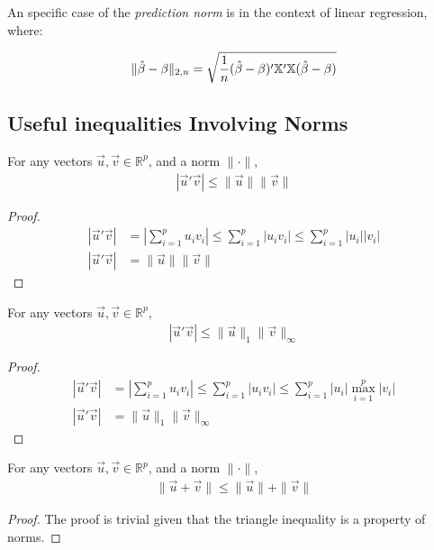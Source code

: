 An specific case of the \emph{prediction norm} is in the context of linear regression, where:

\[
    \|\hat{\beta} - \beta\|_{2, n} 
    = 
    \sqrt{
        \frac{1}{n}
        (\hat{\beta} - \beta)'\mathbb{X}'\mathbb{X}(\hat{\beta} - \beta)
    }
\]

\subsection{Useful inequalities Involving Norms}

\begin{theorem}
For any vectors \(\Vec{u}, \Vec{v} \in \mathbb{R}^p\), and a norm \(\|\cdot\|\),
\begin{align*}
    |\Vec{u}'\Vec{v}| \leq \|\Vec{u}\| \|\Vec{v}\|
\end{align*}
\begin{proof}
\begin{align*}
    |\Vec{u}'\Vec{v}| &= \left|\sum_{i=1}^p u_i v_i\right| 
    \leq \sum_{i=1}^p |u_i v_i| 
    \leq \sum_{i=1}^p |u_i| |v_i|\\
    |\Vec{u}'\Vec{v}| &= \|\Vec{u}\| \|\Vec{v}\|
\end{align*}
\end{proof}
\end{theorem}

\begin{theorem}
For any vectors \(\Vec{u}, \Vec{v} \in \mathbb{R}^p\), 
\begin{align*}
    |\Vec{u}'\Vec{v}| \leq \|\Vec{u}\|_1 \|\Vec{v}\|_{\infty}
\end{align*}
    \begin{proof}
    \begin{align*}
        |\Vec{u}'\Vec{v}| &= \left|\sum_{i=1}^p u_i v_i\right| 
        \leq \sum_{i=1}^p |u_i v_i| 
        \leq \sum_{i=1}^p |u_i| \max_{i=1}^p |v_i| \\
        |\Vec{u}'\Vec{v}| &= \|\Vec{u}\|_1 \|\Vec{v}\|_{\infty}
    \end{align*}
    \end{proof}
\end{theorem}

\begin{theorem}
For any vectors \(\Vec{u}, \Vec{v} \in \mathbb{R}^p\), and a norm \(\|\cdot\|\),
\begin{align*}
    \|\Vec{u} + \Vec{v}\| \leq \|\Vec{u}\| + \|\Vec{v}\|
\end{align*}
\begin{proof}
    The proof is trivial given that the triangle inequality is a property of norms.
\end{proof}
\end{theorem}